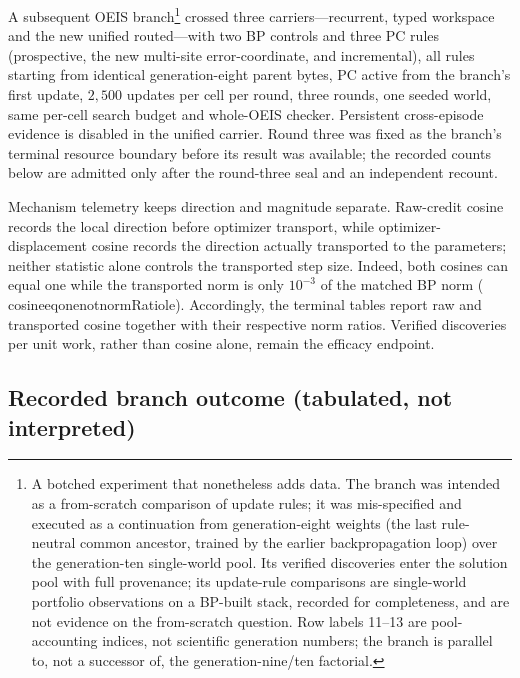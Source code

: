 \documentclass[11pt]{article}
\newcommand{\leanname}[1]{{\scriptsize\ttfamily
  \def\_{\textunderscore\allowbreak}#1}}
\newif\ifoeisterminalfacts
\begin{document}
A subsequent OEIS branch\footnote{A botched experiment that nonetheless adds data.
The branch was intended as a from-scratch comparison of update rules; it was
mis-specified and executed as a continuation from generation-eight weights (the last
rule-neutral common ancestor, trained by the earlier backpropagation loop) over the
generation-ten single-world pool. Its verified discoveries enter the solution pool
with full provenance; its update-rule comparisons are single-world portfolio
observations on a BP-built stack, recorded for completeness, and are not evidence on
the from-scratch question. Row labels 11--13 are pool-accounting indices, not
scientific generation numbers; the branch is parallel to, not a successor of, the
generation-nine/ten factorial.} crossed three carriers---recurrent, typed workspace
and the new unified routed---with two BP controls and three PC rules (prospective,
the new multi-site error-coordinate, and incremental), all rules starting from
identical generation-eight parent bytes, PC active from the branch's first update,
$2{,}500$ updates per cell per round, three rounds, one seeded world, same per-cell
search budget and whole-OEIS checker. Persistent
cross-episode evidence is disabled in the unified carrier. Round three was fixed as
the branch's terminal resource boundary before its result was available; the recorded
counts below are admitted only after the round-three seal and an independent recount.

Mechanism telemetry keeps direction and magnitude separate. Raw-credit cosine records
the local direction before optimizer transport, while optimizer-displacement cosine
records the direction actually transported to the parameters; neither statistic alone
controls the transported step size. Indeed, both cosines can equal one while the
transported norm is only $10^{-3}$ of the matched BP norm
(\leanname{cosine\_eq\_one\_not\_normRatio\_le}). Accordingly,
the terminal tables report raw and transported cosine together with their respective
norm ratios. Verified discoveries per unit work, rather than cosine alone, remain the
efficacy endpoint.

\ifoeisterminalfacts
\subsection{Recorded branch outcome (tabulated, not interpreted)}
\label{sec:pc-terminal}
\end{document}
